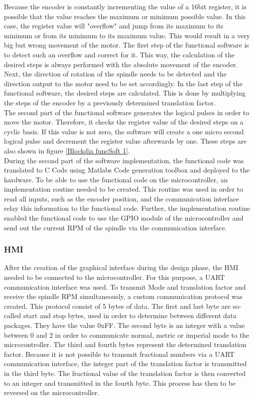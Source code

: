 Because the encoder is constantly incrementing the value of a 16bit register, it is possible that the value reaches the maximum or minimum possible value. In this case, the register value will "overflow" and jump from its maximum to its minimum or from its minimum to its maximum value. This would result in a very big but wrong movement of the motor. The first step of the functional software is to detect such an overflow and correct for it. This way, the calculation of the desired steps is always performed with the absolute movement of the encoder. Next, the direction of rotation of the spindle needs to be detected and the direction output to the motor need to be set accordingly. In the last step of the functional software, the desired steps are calculated. This is done by multiplying the steps of the encoder by a previously determined translation factor.\\
The second part of the functional software generates the logical pulses in order to move the motor. Therefore, it checks the register value of the desired steps on a cyclic basis. If this value is not zero, the software will create a one micro second logical pulse and decrement the register value afterwards by one. These steps are also shown in figure \ref{Blockdia funcSoft 1}.\\
During the second part of the software implementation, the functional code was translated to C Code using Matlabs Code generation toolbox and deployed to the hardware. To be able to use the functional code on the microcontroller, an implementation routine needed to be created. This routine was used in order to read all inputs, such as the encoder position, and the communication interface relay this information to the functional code. Further, the implementation routine enabled the functional code to use the GPIO module of the microcontroller and send out the current RPM of the spindle via the communication interface.
 
\subsubsection{HMI}
After the creation of the graphical interface during the design phase, the HMI needed to be connected to the microcontroller. For this purpose, a UART communication interface was used. To transmit Mode and translation factor and receive the spindle RPM simultaneously, a custom communication protocol was created. This protocol consist of 5 bytes of data. The first and last byte are so-called start and stop bytes, used in order to determine between different data packages. They have the value 0xFF. The second byte is an integer with a value between 0 and 2 in order to communicate normal, metric or imperial mode to the microcontroller. The third and fourth bytes represent the determined translation factor. Because it is not possible to transmit fractional numbers via a UART communication interface, the integer part of the translation factor is transmitted in the third byte. The fractional value of the translation factor is then converted to an integer and transmitted in the fourth byte. This process has then to be reversed on the microcontroller.
 
